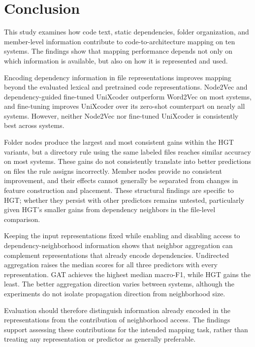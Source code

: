 \section{Conclusion\label{sec:conclusion}}

This study examines how code text, static dependencies, folder organization, and member-level information contribute to code-to-architecture mapping on ten systems. The findings show that mapping performance depends not only on which information is available, but also on how it is represented and used.

Encoding dependency information in file representations improves mapping beyond the evaluated lexical and pretrained code representations. Node2Vec and dependency-guided fine-tuned UniXcoder outperform Word2Vec on most systems, and fine-tuning improves UniXcoder over its zero-shot counterpart on nearly all systems. However, neither Node2Vec nor fine-tuned UniXcoder is consistently best across systems.

Folder nodes produce the largest and most consistent gains within the HGT variants, but a directory rule using the same labeled files reaches similar accuracy on most systems. These gains do not consistently translate into better predictions on files the rule assigns incorrectly. Member nodes provide no consistent improvement, and their effects cannot generally be separated from changes in feature construction and placement. These structural findings are specific to HGT; whether they persist with other predictors remains untested, particularly given HGT's smaller gains from dependency neighbors in the file-level comparison.


Keeping the input representations fixed while enabling and disabling access to dependency-neighborhood information shows that neighbor aggregation can complement representations that already encode dependencies. Undirected aggregation raises the median scores for all three predictors with every representation. GAT achieves the highest median macro-F1, while HGT gains the least. The better aggregation direction varies between systems, although the experiments do not isolate propagation direction from neighborhood size. 

Evaluation should therefore distinguish information already encoded in the representations from the contribution of neighborhood access. The findings support assessing these contributions for the intended mapping task, rather than treating any representation or predictor as generally preferable.

